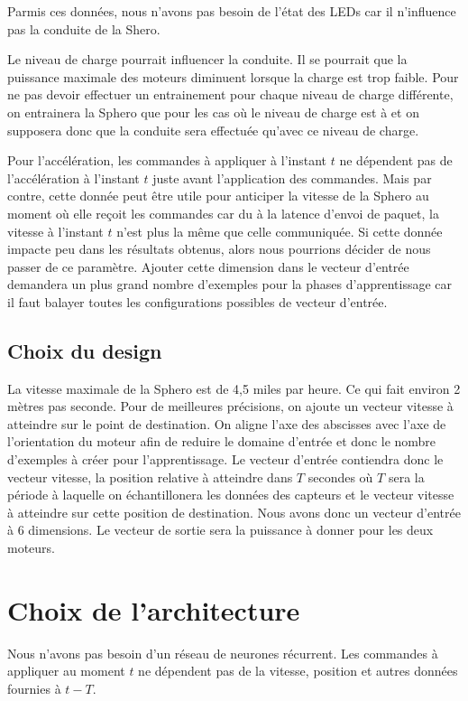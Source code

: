 \documentclass[12pt,a4paper,oneside, titlepage]{article}
\begin{document}
Parmis ces données, nous n'avons pas besoin de l'état des LEDs car il n'influence pas la conduite de la Shero.

Le niveau de charge pourrait influencer la conduite.
Il se pourrait que la puissance maximale des moteurs diminuent lorsque la charge est trop faible.
Pour ne pas devoir effectuer un entrainement pour chaque niveau de charge différente, on entrainera la Sphero que pour les cas où le niveau de charge est à  et on supposera donc que la conduite sera effectuée qu'avec ce niveau de charge.

Pour l'accélération, les commandes à appliquer à l'instant $t$ ne dépendent pas de l'accélération à l'instant $t$ juste avant l'application des commandes.
Mais par contre, cette donnée peut être utile pour anticiper la vitesse de la Sphero au moment où elle reçoit les commandes car du à la latence d'envoi de paquet, la vitesse à l'instant $t$ n'est plus la même que celle communiquée.
Si cette donnée impacte peu dans les résultats obtenus, alors nous pourrions décider de nous passer de ce paramètre.
Ajouter cette dimension dans le vecteur d'entrée demandera un plus grand nombre d'exemples pour la phases d'apprentissage car il faut balayer toutes les configurations possibles de vecteur d'entrée.

\subsection{Choix du design}

La vitesse maximale de la Sphero est de 4,5 miles par heure\cite{product}.
Ce qui fait environ 2 mètres pas seconde.
Pour de meilleures précisions, on ajoute un vecteur vitesse à atteindre sur le point de destination.
On aligne l'axe des abscisses avec l'axe de l'orientation du moteur afin de reduire le domaine d'entrée et donc le nombre d'exemples à créer pour l'apprentissage.
Le vecteur d'entrée contiendra donc le vecteur vitesse, la position relative à atteindre dans $T$ secondes où $T$ sera la période à laquelle on échantillonera les données des capteurs et le vecteur vitesse à atteindre sur cette position de destination.
Nous avons donc un vecteur d'entrée à 6 dimensions.
Le vecteur de sortie sera la puissance à donner pour les deux moteurs.

\section{Choix de l'architecture}
Nous n'avons pas besoin d'un réseau de neurones récurrent. Les commandes à appliquer au moment $t$ ne dépendent pas de la vitesse, position et autres données fournies à $t-T$.
\end{document}
